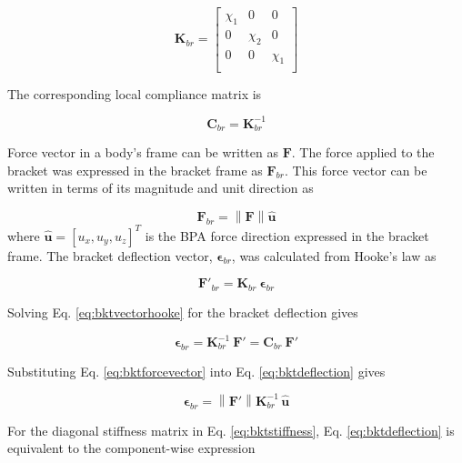 \begin{equation}
\mathbf{K}_{br} = 
\begin{bmatrix}
\chi_{1} & 0   & 0 \\
0   & \chi_{2} & 0 \\
0   & 0   & \chi_{1} \\
\end{bmatrix}
\label{eq:bktstiffness}
\end{equation}

The corresponding local compliance matrix is 

\begin{equation}
\mathbf{C}_{br} = \mathbf{K}_{br}^{-1}
\label{eq:bktcompliance}
\end{equation}

Force vector in a body's frame can be written as $\mathbf{F}$. The force applied to the bracket was expressed in the bracket frame as $\mathbf{F}_{br}$. This force vector can be written in terms of its magnitude and unit direction as

\begin{equation}
\mathbf{F}_{br} = \left\| \mathbf{F} \right\| \hat{\mathbf{u}}
\label{eq:bktforcevector}
\end{equation}
\noindent
where $\hat{\mathbf{u}} = [u_{x}, u_{y}, u_{z}]^{T}$ is the BPA force direction expressed in the bracket frame. The bracket deflection vector, $\boldsymbol{\epsilon}_{br}$, was calculated from Hooke's law as 

\begin{equation} \mathbf{F}'_{br} = \mathbf{K}_{br} \: \boldsymbol{\epsilon}_{br}
\label{eq:bktvectorhooke}
\end{equation}

Solving Eq. \ref{eq:bktvectorhooke} for the bracket deflection gives

\begin{equation}
\boldsymbol{\epsilon}_{br} = \mathbf{K}_{br}^{-1} \: \mathbf{F}' = \mathbf{C}_{br} \: \mathbf{F}'
\label{eq:bktdeflection}
\end{equation}

Substituting Eq. \ref{eq:bktforcevector} into Eq. \ref{eq:bktdeflection} gives

\begin{equation}
\boldsymbol{\epsilon}_{br} = \left\| \mathbf{F}' \right\| \mathbf{K}_{br}^{-1} \,\hat{\mathbf{u}}
\label{eq:bktdeflectionforceunit}
\end{equation}

For the diagonal stiffness matrix in Eq. \ref{eq:bktstiffness}, Eq. \ref{eq:bktdeflection} is equivalent to the component-wise expression

